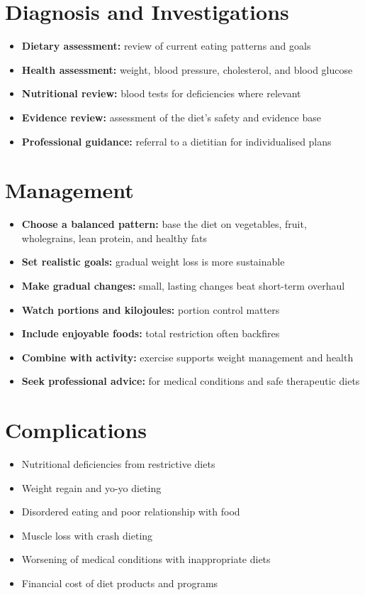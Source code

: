 \section*{Diagnosis and Investigations}
\begin{itemize}
    \item \textbf{Dietary assessment:} review of current eating patterns and goals
    \item \textbf{Health assessment:} weight, blood pressure, cholesterol, and blood glucose
    \item \textbf{Nutritional review:} blood tests for deficiencies where relevant
    \item \textbf{Evidence review:} assessment of the diet's safety and evidence base
    \item \textbf{Professional guidance:} referral to a dietitian for individualised plans
\end{itemize}

\section*{Management}
\begin{itemize}
    \item \textbf{Choose a balanced pattern:} base the diet on vegetables, fruit, wholegrains, lean protein, and healthy fats
    \item \textbf{Set realistic goals:} gradual weight loss is more sustainable
    \item \textbf{Make gradual changes:} small, lasting changes beat short-term overhaul
    \item \textbf{Watch portions and kilojoules:} portion control matters
    \item \textbf{Include enjoyable foods:} total restriction often backfires
    \item \textbf{Combine with activity:} exercise supports weight management and health
    \item \textbf{Seek professional advice:} for medical conditions and safe therapeutic diets
\end{itemize}

\section*{Complications}
\begin{itemize}
    \item Nutritional deficiencies from restrictive diets
    \item Weight regain and yo-yo dieting
    \item Disordered eating and poor relationship with food
    \item Muscle loss with crash dieting
    \item Worsening of medical conditions with inappropriate diets
    \item Financial cost of diet products and programs
\end{itemize}

